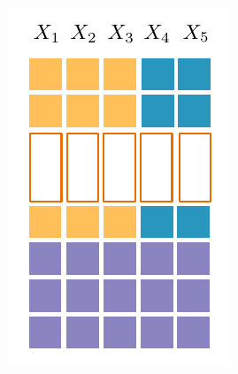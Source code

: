 \documentclass[xcolor={usenames,dvipsnames,svgnames}, compress]{beamer}
\begin{document}
\begin{frame}
\begin{minipage}[t]{1.3909cm}
    \includegraphics[width=\linewidth]{figures/grid-3}                                                             \end{minipage}


\end{frame}
\end{document}
